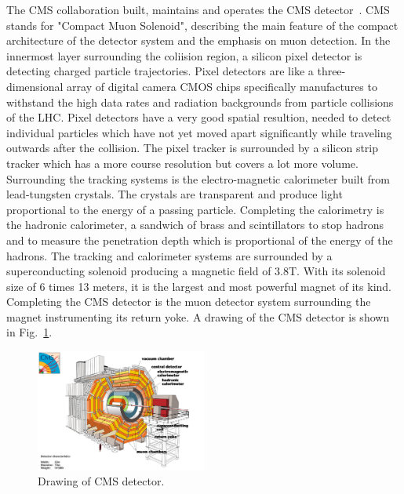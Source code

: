 \documentclass{wscpaperproc}
\theoremstyle{wsc}
\begin{document}
The CMS collaboration built, maintains and operates the CMS detector~. CMS stands for "Compact Muon Solenoid", describing the main feature of the compact architecture of the detector system and the emphasis on muon detection. In the innermost layer surrounding the coliision region, a silicon pixel detector is detecting charged particle trajectories. Pixel detectors are like a three-dimensional array of digital camera CMOS chips specifically manufactures to withstand the high data rates and radiation backgrounds from particle collisions of the LHC. Pixel detectors have a very good spatial resultion, needed to detect individual particles which have not yet moved apart significantly while traveling outwards after the collision. The pixel tracker is surrounded by a silicon strip tracker which has a more course resolution but covers a lot more volume. Surrounding the tracking systems is the electro-magnetic calorimeter built from lead-tungsten crystals. The crystals are transparent and produce light proportional to the energy of a passing particle. Completing the calorimetry is the hadronic calorimeter, a sandwich of brass and scintillators to stop hadrons and to measure the penetration depth which is proportional of the energy of the hadrons. The tracking and calorimeter systems are surrounded by a superconducting solenoid producing a magnetic field of 3.8T. With its solenoid size of 6 times 13 meters, it is the largest and most powerful magnet of its kind. Completing the CMS detector is the muon detector system surrounding the magnet instrumenting its return yoke. A drawing of the CMS detector is shown in Fig.~\ref{fig:cms}.

\begin{figure}[htb]
{
   \centering
   \includegraphics[width=0.50\textwidth]{cms}
   \caption{Drawing of CMS detector.
   \label{fig:cms}}
}
\end{figure}
\end{document}

